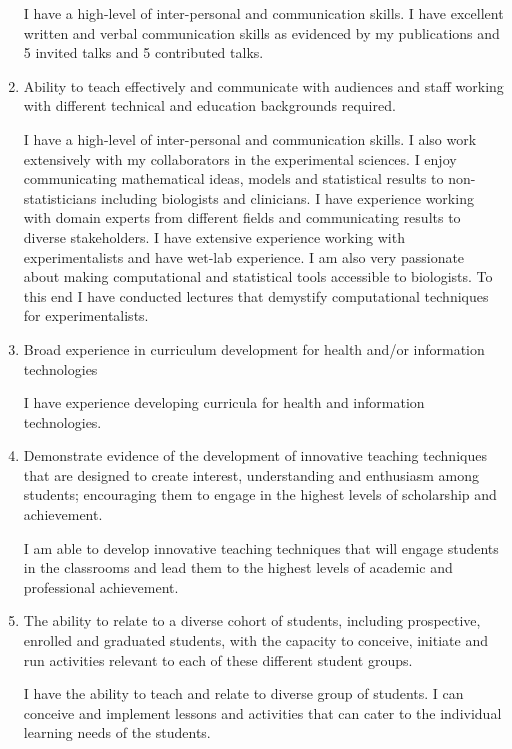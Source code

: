 \documentclass[10pt]{article}
\begin{document}
\begin{enumerate}
I have a high-level of inter-personal and communication skills.
I have excellent written and verbal communication skills as evidenced by my publications and 5 invited talks and 5 contributed talks.


\item Ability to teach effectively and communicate with audiences and staff working with different technical and education backgrounds required.

I have a high-level of inter-personal and communication skills.
 I also work extensively with my collaborators in the experimental sciences. 
 I enjoy communicating mathematical ideas, models and statistical results to non-statisticians including biologists and clinicians.
I have experience working with domain experts from different fields and communicating results to diverse stakeholders.
I have extensive experience working with experimentalists and have wet-lab experience. I am also very passionate about making computational and statistical tools accessible to biologists. To this end I have conducted lectures that demystify computational techniques for experimentalists. 


\item Broad experience in curriculum development for health and/or information technologies

I have experience developing curricula for health and information technologies.


\item Demonstrate evidence of the development of innovative teaching techniques that are designed to create
interest, understanding and enthusiasm among students; encouraging them to engage in the highest levels of scholarship and achievement.

I am able to develop innovative teaching techniques that will engage students in the classrooms and lead them to the highest levels of academic and professional achievement.


\item The ability to relate to a diverse cohort of students, including prospective, enrolled and graduated students,  with the capacity to conceive, initiate and run activities relevant to each of these different student groups.



I have the ability to teach and relate to diverse group of students. I can conceive and implement lessons and activities that can cater to the individual learning needs of the students.




\end{enumerate}
\end{document}
